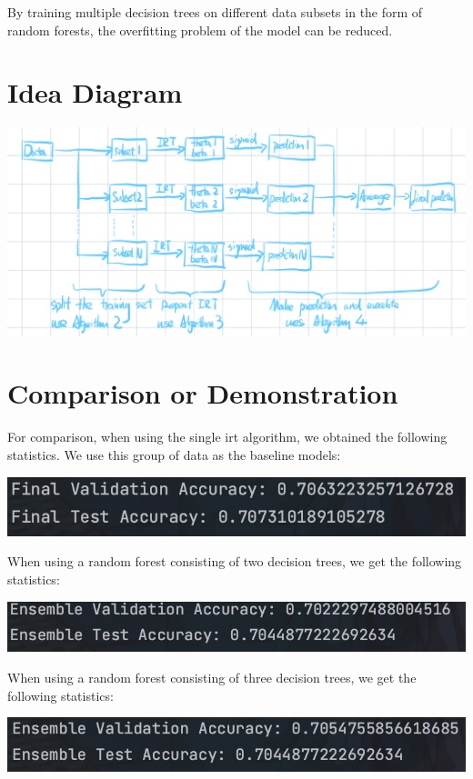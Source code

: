 \documentclass{article}
\begin{document}
By training multiple decision trees on different data subsets in the form of random forests, the overfitting problem of the model can be reduced.

\section*{Idea Diagram}

\includegraphics[width=1.0\linewidth]{笔记 2024年8月9日.jpeg}

\section*{Comparison or Demonstration}

For comparison, when using the single irt algorithm, we obtained the following statistics. We use this group of data as the baseline models:

\includegraphics[width=0.7\linewidth]{6061723195551_.pic.jpg}

When using a random forest consisting of two decision trees, we get the following statistics:

\includegraphics[width=0.7\linewidth]{6081723195750_.pic.jpg}

When using a random forest consisting of three decision trees, we get the following statistics:

\includegraphics[width=0.7\linewidth]{6101723195879_.pic.jpg}
\end{document}
